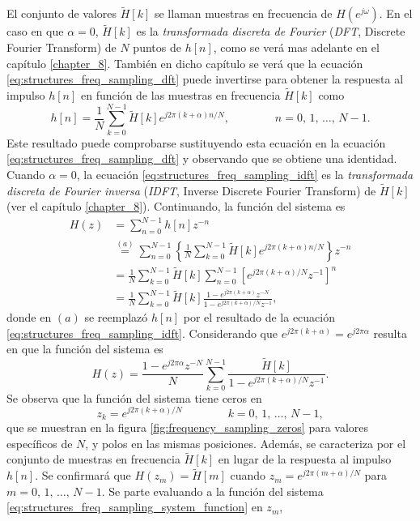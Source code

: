 \documentclass[a4paper]{report}
\begin{document}
El conjunto de valores \(\tilde{H}[k]\) se llaman muestras en frecuencia de \(H(e^{j\omega})\). En el caso en que \(\alpha=0\), \(\tilde{H}[k]\) es la \emph{transformada discreta de Fourier} (\emph{DFT}, Discrete Fourier Transform) de \(N\) puntos de \(h[n]\), como se verá mas adelante en el capítulo \ref{chapter_8}. También en dicho capítulo se verá que la ecuación \ref{eq:structures_freq_sampling_dft} puede invertirse para obtener la respuesta al impulso \(h[n]\) en función de las muestras en frecuencia \(\tilde{H}[k]\) como
\begin{equation}\label{eq:structures_freq_sampling_idft}
 h[n]=\frac{1}{N}\sum_{k=0}^{N-1}\tilde{H}[k]e^{j2\pi(k+\alpha)n/N},
 \qquad\qquad 
 n=0,\,1,\,\dots,\,N-1.  
\end{equation}
Este resultado puede comprobarse sustituyendo esta ecuación en la ecuación \ref{eq:structures_freq_sampling_dft} y observando que se obtiene una identidad. Cuando \(\alpha=0\), la ecuación \ref{eq:structures_freq_sampling_idft} es la \emph{transformada discreta de Fourier inversa} (\emph{IDFT}, Inverse Discrete Fourier Transform) de \(\tilde{H}[k]\) (ver el capítulo \ref{chapter_8}). Continuando, la función del sistema es
\begin{align*}
 H(z)&=\sum_{n=0}^{N-1}h[n]z^{-n}\\
  &\overset{(a)}{=}\sum_{n=0}^{N-1}\left\{\frac{1}{N}\sum_{k=0}^{N-1}\tilde{H}[k]e^{j2\pi(k+\alpha)n/N}\right\}z^{-n}\\
  &=\frac{1}{N}\sum_{k=0}^{N-1}\tilde{H}[k]\sum_{n=0}^{N-1}\left[e^{j2\pi(k+\alpha)/N}z^{-1}\right]^n\\
  &=\frac{1}{N}\sum_{k=0}^{N-1}\tilde{H}[k]\frac{1-e^{j2\pi(k+\alpha)}z^{-N}}{1-e^{j2\pi(k+\alpha)/N}z^{-1}},
\end{align*}
donde en \((a)\) se reemplazó \(h[n]\) por el resultado de la ecuación \ref{eq:structures_freq_sampling_idft}. Considerando que \(e^{j2\pi(k+\alpha)}=e^{j2\pi\alpha}\) resulta en que la función del sistema es
\begin{equation}\label{eq:structures_freq_sampling_system_function}
 H(z)=\frac{1-e^{j2\pi\alpha}z^{-N}}{N}\sum_{k=0}^{N-1}\frac{\tilde{H}[k]}{1-e^{j2\pi(k+\alpha)/N}z^{-1}}.
\end{equation}
Se observa que la función del sistema tiene ceros en 
\[
 z_k=e^{j2\pi(k+\alpha)/N}
 \qquad\qquad 
 k=0,\,1,\,\dots,\,N-1,  
\]
que se muestran en la figura \ref{fig:frequency_sampling_zeros} para valores específicos de \(N\), y polos en las mismas posiciones. Además, se caracteriza por el conjunto de muestras en frecuencia \(\tilde{H}[k]\) en lugar de la respuesta al impulso \(h[n]\). Se confirmará que \(H(z_m)=\tilde{H}[m]\) cuando \(z_m=e^{j2\pi(m+\alpha)/N}\) para \(m=0,\,1,\,\dots,\,N-1\). Se parte evaluando a la función del sistema \ref{eq:structures_freq_sampling_system_function} en \(z_m\),
\end{document}
